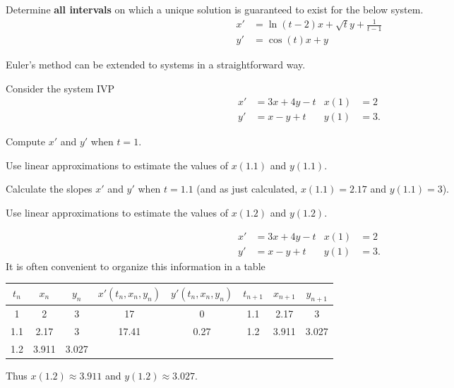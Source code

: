 \begin{applicationActivities}
\begin{activity}{5}
Determine \textbf{all intervals} on which a unique solution is guaranteed to exist for the below system.
\begin{align*}
x' &= \ln(t-2) x + \sqrt{t} y + \frac{1}{t-1}  \\
y' &= \cos(t) x +  y  
\end{align*}

\end{activity}


\begin{activity}{10}
Euler's method can be extended to systems in a straightforward way.
\vfill

Consider the system IVP
\begin{align*}
x' &= 3x+4y-t & x(1)&=2 \\
y' &= x-y+t & y(1)&=3 .
\end{align*}

\begin{subactivity}
Compute \(x'\) and \(y'\)  when \(t=1\).
\end{subactivity}
\begin{subactivity}
Use linear approximations to estimate the values of \(x(1.1)\) and \(y(1.1)\).
\end{subactivity}
\begin{subactivity}
Calculate the slopes \(x'\) and \(y'\) when \(t=1.1\) (and as just calculated, \(x(1.1)=2.17\) and \(y(1.1)=3\)). 
\end{subactivity}
\begin{subactivity}
Use linear approximations to estimate the values of \(x(1.2)\) and \(y(1.2)\).
\end{subactivity}
\end{activity}

\begin{observation}
\begin{align*}
x' &= 3x+4y-t & x(1)&=2 \\
y' &= x-y+t & y(1)&=3 .
\end{align*}
\vfill
It is often convenient to organize this information in a table
\begin{center}
\begin{tabular}{c|c|c||c|c||c|c|c|}
\(t_n\) & \(x_n\) & \(y_n\) & \(x'(t_n,x_n,y_n)\) &  \(y'(t_n,x_n,y_n)\) & \(t_{n+1}\) & \(x_{n+1}\) & \(y_{n+1}\) \\ \hline \hline
1 & 2 & 3 & 17 & 0 & 1.1 & 2.17 & 3  \\ \hline
1.1 & 2.17 & 3 & 17.41 & 0.27 & 1.2 & 3.911 & 3.027 \\ \hline
1.2 & 3.911 & 3.027 &  &  &  &  &  \\ \hline
\end{tabular}
\end{center}
\vfill
Thus \(x(1.2) \approx 3.911\) and \(y(1.2) \approx 3.027\).
\end{observation}


\end{applicationActivities}
